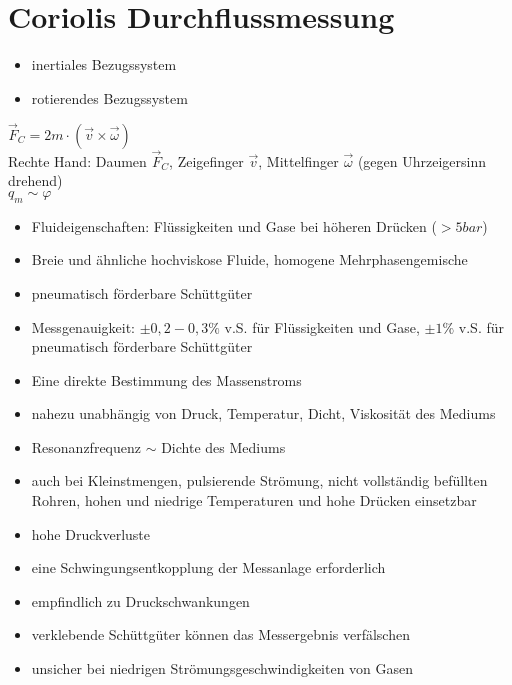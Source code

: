 \section{Coriolis Durchflussmessung}
\begin{itemize}
\item inertiales Bezugssystem
\item rotierendes Bezugssystem
\end{itemize}
$\vec{F}_C=2m\cdot (\vec{v}\times \vec{\omega})$\\
Rechte Hand: Daumen $\vec{F}_C$, Zeigefinger $\vec{v}$, Mittelfinger $\vec{\omega}$ (gegen Uhrzeigersinn drehend)\\
$q_m \sim \varphi$

\begin{itemize}
\item Fluideigenschaften: Flüssigkeiten und Gase bei höheren Drücken ($>5\unit{bar}$)
\item Breie und ähnliche hochviskose Fluide, homogene Mehrphasengemische
\item pneumatisch förderbare Schüttgüter
\item Messgenauigkeit: $\pm 0,2 - 0,3\%$ v.S. für Flüssigkeiten und Gase, $\pm 1\%$ v.S. für pneumatisch förderbare Schüttgüter
\end{itemize}
\begin{itemize}[label=$+$]
\item Eine direkte Bestimmung des Massenstroms
\item nahezu unabhängig von Druck, Temperatur, Dicht, Viskosität des Mediums
\item Resonanzfrequenz $\sim$ Dichte des Mediums
\item auch bei Kleinstmengen, pulsierende Strömung, nicht vollständig befüllten Rohren, hohen und niedrige Temperaturen und hohe Drücken einsetzbar
\end{itemize}
\begin{itemize}[label=$-$]
\item hohe Druckverluste
\item eine Schwingungsentkopplung der Messanlage erforderlich
\item empfindlich zu Druckschwankungen
\item verklebende Schüttgüter können das Messergebnis verfälschen
\item unsicher bei niedrigen Strömungsgeschwindigkeiten von Gasen
\end{itemize}

